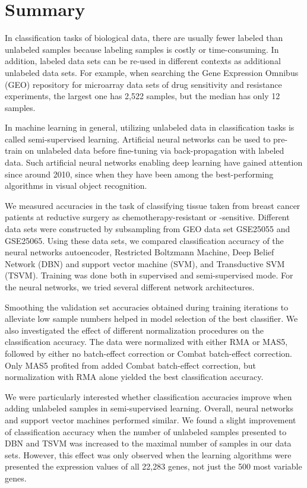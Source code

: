 
\section{Summary}

In classification tasks of biological data, there are usually fewer
labeled than unlabeled samples because labeling samples is costly
or time-consuming. In addition, labeled data sets can be re-used in
different contexts as additional unlabeled data sets. For example,
when searching the Gene Expression Omnibus (GEO) repository for microarray
data sets of drug sensitivity and resistance experiments, the largest
one has 2,522 samples, but the median has only 12 samples.

In machine learning in general, utilizing unlabeled data in classification
tasks is called semi-supervised learning. Artificial neural networks
can be used to pre-train on unlabeled data before fine-tuning via
back-propagation with labeled data. Such artificial neural networks
enabling deep learning have gained attention since around 2010, since
when they have been among the best-performing algorithms in visual
object recognition.

We measured accuracies in the task of classifying tissue taken from
breast cancer patients at reductive surgery as chemotherapy-resistant
or -sensitive. Different data sets were constructed by subsampling
from GEO data set GSE25055 and GSE25065. Using these data sets, we
compared classification accuracy of the neural networks autoencoder,
Restricted Boltzmann Machine, Deep Belief Network (DBN) and support
vector machine (SVM), and Transductive SVM (TSVM). Training was done
both in supervised and semi-supervised mode. For the neural networks,
we tried several different network architectures. 

Smoothing the validation set accuracies obtained during training iterations
to alleviate low sample numbers helped in model selection of the best
classifier. We also investigated the effect of different normalization
procedures on the classification accuracy. The data were normalized
with either RMA or MAS5, followed by either no batch-effect correction
or Combat batch-effect correction. Only MAS5 profited from added Combat
batch-effect correction, but normalization with RMA alone yielded
the best classification accuracy.

We were particularly interested whether classification accuracies
improve when adding unlabeled samples in semi-supervised learning.
Overall, neural networks and support vector machines performed similar.
We found a slight improvement of classification accuracy when the
number of unlabeled samples presented to DBN and TSVM was increased
to the maximal number of samples in our data sets. However, this effect
was only observed when the learning algorithms were presented the
expression values of all 22,283 genes, not just the 500 most variable
genes.
